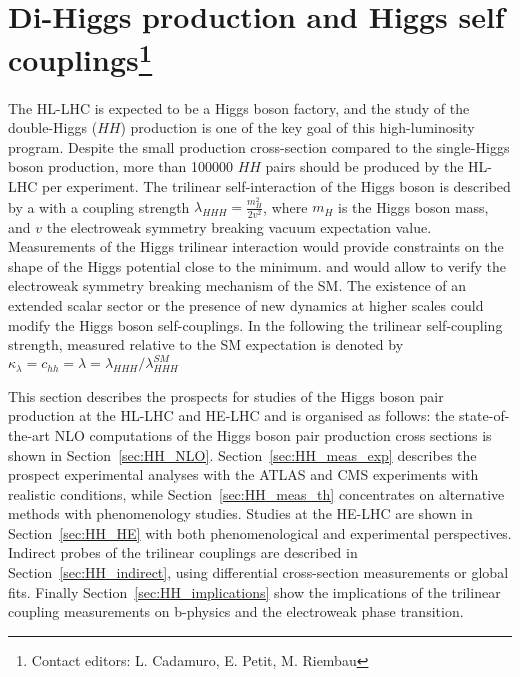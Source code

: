 \documentclass[../report.tex]{subfiles}
\begin{document}
\section{Di-Higgs production and Higgs self couplings\footnote{Contact editors: L. Cadamuro, E. Petit, M. Riembau}\label{sec3}}


The HL-LHC is expected to be a Higgs boson factory, and the study of the double-Higgs ($HH$) production is one of the key goal of this high-luminosity program. Despite the small production cross-section compared to the single-Higgs boson production, more than 100000 $HH$ pairs should be produced by the HL-LHC per experiment. The trilinear self-interaction of the Higgs boson is described by a with a coupling strength $\lambda_{HHH}  = \frac{m_H^2}{2v^2} $, where $m_H$ is the Higgs boson mass, and $v$ the electroweak symmetry breaking vacuum expectation value. Measurements of the Higgs trilinear interaction would provide constraints on the shape of the Higgs potential close to the minimum. and would allow to verify the electroweak symmetry breaking mechanism of the SM.
The existence of an extended scalar sector or the presence of new dynamics at higher scales could modify the Higgs boson self-couplings.
In the following the trilinear self-coupling strength, measured relative to the SM expectation is denoted by $\kappa_{\lambda} = c_{hh} = \lambda = \lambda_{HHH}/\lambda_{HHH}^{SM}$

This section describes the prospects for studies of the Higgs boson pair production at the HL-LHC and HE-LHC and is organised as follows: the state-of-the-art NLO computations of the Higgs boson pair production cross sections is shown in Section~\ref{sec:HH_NLO}. Section~\ref{sec:HH_meas_exp} describes the prospect experimental analyses with the ATLAS and CMS experiments with realistic conditions, while Section~\ref{sec:HH_meas_th} concentrates on alternative methods with phenomenology studies. Studies at the HE-LHC are shown in Section~\ref{sec:HH_HE} with both phenomenological and experimental perspectives. Indirect probes of the trilinear couplings are described in Section~\ref{sec:HH_indirect}, using differential cross-section measurements or global fits. Finally Section~\ref{sec:HH_implications} show the implications of the trilinear coupling measurements on b-physics and the electroweak phase transition.  
\end{document}
